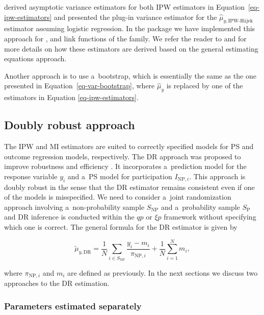 \documentclass[nojss]{jss}
\begin{document}
\citet[Section 3.2]{chen2020doubly} derived asymptotic variance
estimators for both IPW estimators in Equation~\ref{eq-ipw-estimators}
and presented the plug-in variance estimator for the
\(\hat{\mu}_{y,\text{IPW-H\'{a}jek}}\) estimator assuming logistic
regression. In the package we have implemented this approach for
,  and  link functions of
the  family. We refer the reader to
\citet[Section 6.2]{wu2022statistical} and
\citet[Chapter 3]{chrostowski2024statistical} for more details on how
these estimators are derived based on the general estimating equations
approach.

Another approach is to use a~bootstrap, which is essentially the same as
the one presented in Equation~\ref{eq-var-bootstrap}, where
\(\hat{\mu}_{y}\) is replaced by one of the estimators in Equation
\ref{eq-ipw-estimators}.

\subsection{Doubly robust approach}\label{sec-dr-approach}

The IPW and MI estimators are suited to correctly specified models for
PS and outcome regression models, respectively. The DR approach was
proposed to improve robustness and efficiency
\citep[cf.][]{robins1994estimation}. It incorporates a~prediction model
for the response variable \(y_i\) and a~PS model for participation
\(I_{\text{NP},i}\). This approach is doubly robust in the sense that
the DR estimator remains consistent even if one of the models is
misspecified. We need to consider a~joint randomization approach
involving a~non-probability sample \(S_{\text{NP}}\) and a~probability
sample \(S_{\text{P}}\) and DR inference is conducted within the \(qp\)
or \(\xi p\) framework without specifying which one is correct. The
general formula for the DR estimator is given by

\[
\tilde{\mu}_{y,\text{DR}} = \frac{1}{N}\sum_{i \in S_{\text{NP}}}\frac{y_i - m_i}{\pi_{\text{NP},i}} + \frac{1}{N}\sum_{i =1}^N m_i,
\]

where \(\pi_{\text{NP},i}\) and \(m_i\) are defined as previously. In
the next sections we discuss two approaches to the DR estimation.

\subsubsection{Parameters estimated
separately}\label{parameters-estimated-separately}
\end{document}
